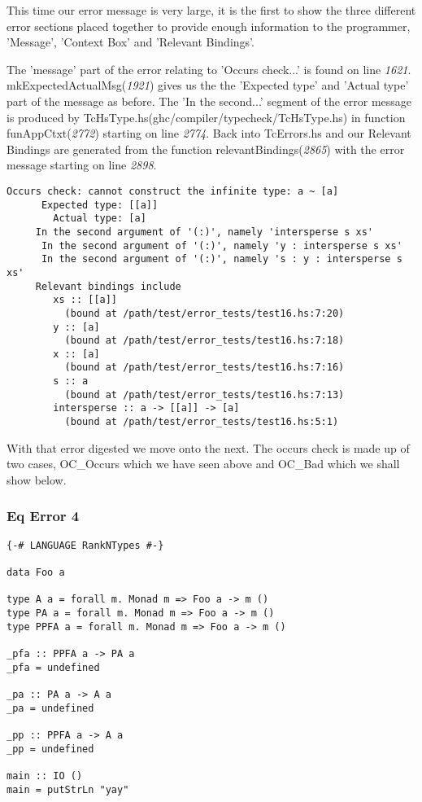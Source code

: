 \documentclass[a4paper]{article}
\begin{document}
This time our error message is very large, it is the first to show the three different error sections placed together to provide enough information to the programmer, 'Message', 'Context Box' and 'Relevant Bindings'.  

The 'message' part of the error relating to 'Occurs check...' is found on line \textit{1621}.  mkExpectedActualMsg(\textit{1921})  gives us the the 'Expected type' and 'Actual type' part of the message as before. The 'In the second...' segment of the error message is produced by TcHsType.hs(ghc/compiler/typecheck/TcHsType.hs) in function funAppCtxt(\textit{2772}) starting on line \textit{2774}. Back into TcErrors.hs and our Relevant Bindings are generated from the function relevantBindings(\textit{2865}) with the error message starting on line \textit{2898}.

\begin{lstlisting}[label={lst: T9.0.2}, numbers=none, caption={Error}]
Occurs check: cannot construct the infinite type: a ~ [a]
      Expected type: [[a]]
        Actual type: [a]
     In the second argument of '(:)', namely 'intersperse s xs'
      In the second argument of '(:)', namely 'y : intersperse s xs'
      In the second argument of '(:)', namely 's : y : intersperse s xs'
     Relevant bindings include
        xs :: [[a]]
          (bound at /path/test/error_tests/test16.hs:7:20)
        y :: [a]
          (bound at /path/test/error_tests/test16.hs:7:18)
        x :: [a]
          (bound at /path/test/error_tests/test16.hs:7:16)
        s :: a
          (bound at /path/test/error_tests/test16.hs:7:13)
        intersperse :: a -> [[a]] -> [a]
          (bound at /path/test/error_tests/test16.hs:5:1)
\end{lstlisting}

With that error digested we move onto the next. The occurs check is made up of two cases, OC\_Occurs which we have seen above and OC\_Bad which we shall show below. 

\subsubsection{Eq Error 4}

\begin{lstlisting}[label={lst: T10.0}, numbers=none, caption={Example Program \cite{ex10}}]
{-# LANGUAGE RankNTypes #-}

data Foo a

type A a = forall m. Monad m => Foo a -> m ()
type PA a = forall m. Monad m => Foo a -> m ()
type PPFA a = forall m. Monad m => Foo a -> m ()

_pfa :: PPFA a -> PA a
_pfa = undefined

_pa :: PA a -> A a
_pa = undefined

_pp :: PPFA a -> A a
_pp = undefined

main :: IO ()
main = putStrLn "yay"
\end{lstlisting}
\end{document}
